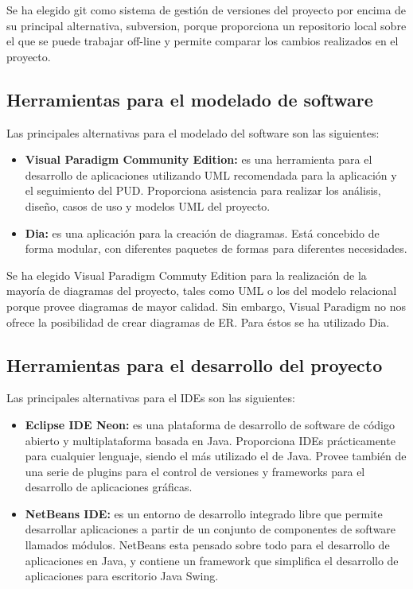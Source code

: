 \documentclass[12pt, a4paper]{book}
\begin{document}
Se ha elegido git como sistema de gestión de versiones del proyecto por encima de su principal alternativa, subversion, porque proporciona un repositorio local sobre el que se puede trabajar off-line y permite comparar los cambios realizados en el proyecto.



\subsection{Herramientas para el modelado de software}

Las principales alternativas para el modelado del software son las siguientes:

\begin{itemize}
	\item \textbf{Visual Paradigm Community Edition:} es una herramienta para el desarrollo de aplicaciones utilizando \gls{UML} recomendada para la aplicación y el seguimiento del \gls{PUD}. Proporciona asistencia para realizar los análisis, diseño, casos de uso y modelos \gls{UML} del proyecto.
	
	\item \textbf{Dia:} es una aplicación para la creación de diagramas. Está concebido de forma modular, con diferentes paquetes de formas para diferentes necesidades.
	
	
\end{itemize}

Se ha elegido Visual Paradigm Commuty Edition para la realización de la mayoría de diagramas del proyecto, tales como \gls{UML} o los del modelo relacional porque provee diagramas de mayor calidad. Sin embargo, Visual Paradigm no nos ofrece la posibilidad de crear diagramas de \gls{ER}. Para éstos se ha utilizado Dia.

\newpage

\subsection{Herramientas para el desarrollo del proyecto}

Las principales alternativas para el \glspl{IDE} son las siguientes:

\begin{itemize}
	\item \textbf{Eclipse IDE Neon:} es una plataforma de desarrollo de software de código abierto y multiplataforma basada en Java. Proporciona \glspl{IDE} prácticamente para cualquier lenguaje, siendo el más utilizado el de Java. Provee también de una serie de plugins para el control de versiones y frameworks para el desarrollo de aplicaciones gráficas.
	
	
	\item \textbf{NetBeans IDE:} es un entorno de desarrollo integrado libre que permite desarrollar aplicaciones a partir de un conjunto de componentes de software llamados módulos. NetBeans esta pensado sobre todo para el desarrollo de aplicaciones en Java, y contiene un framework que simplifica el desarrollo de aplicaciones para escritorio Java Swing.
	
	
\end{itemize}
\end{document}
